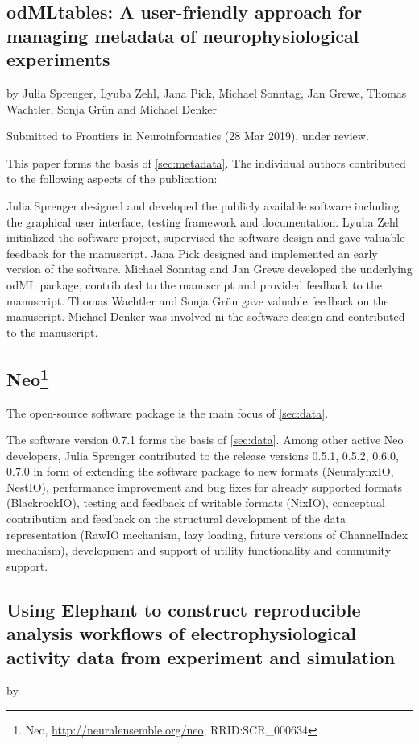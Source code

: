 \subsection*{odMLtables: A user-friendly approach for managing metadata of neurophysiological experiments}
by Julia Sprenger, Lyuba Zehl, Jana Pick, Michael Sonntag, Jan Grewe, Thomas Wachtler, Sonja Grün and Michael Denker

Submitted to Frontiers in Neuroinformatics (28 Mar 2019), under review.

This paper forms the basis of \cref{sec:metadata}. The individual authors contributed to the following aspects of the publication:

Julia Sprenger designed and developed the publicly available software including the graphical user interface, testing framework and documentation. Lyuba Zehl initialized the software project, supervised the software design and gave valuable feedback for the manuscript. Jana Pick designed and implemented an early version of the software. Michael Sonntag and Jan Grewe developed the underlying odML package, contributed to the manuscript and provided feedback to the manuscript. Thomas Wachtler and Sonja Grün gave valuable feedback on the manuscript. Michael Denker was involved ni the software design and contributed to the manuscript.

\subsection*{Neo\footnote{Neo, \url{http://neuralensemble.org/neo}, RRID:SCR\_000634}}
The open-source software package \citep{garcia_neo:_2014-1} is the main focus of \cref{sec:data}. 

The software version 0.7.1 forms the basis of \cref{sec:data}. Among other active Neo developers, Julia Sprenger contributed to the release versions 0.5.1, 0.5.2, 0.6.0, 0.7.0 in form of extending the software package to new formats (NeuralynxIO, NestIO), performance improvement and bug fixes for already supported formats (BlackrockIO), testing and feedback of writable formats (NixIO), conceptual contribution and feedback on the structural development of the data representation (RawIO mechanism, lazy loading, future versions of ChannelIndex mechanism), development and support of utility functionality and community support.

\subsection*{Using Elephant to construct reproducible analysis workflows of electrophysiological activity data from experiment and simulation}
by 


